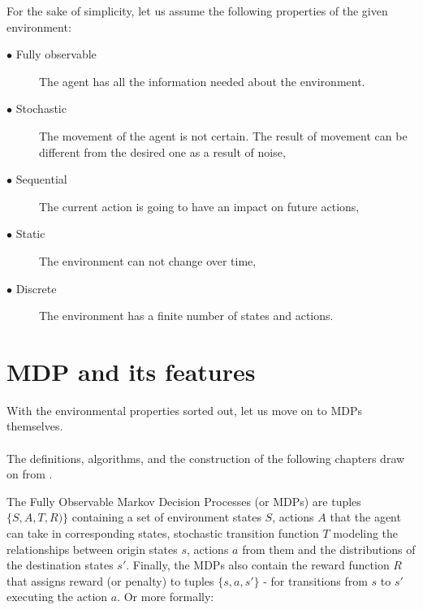 For the sake of simplicity, let us assume the following properties of the given environment:
\begin{description}


  \item[$\bullet$ Fully observable] The agent has all the information needed about the environment.
  \item[$\bullet$ Stochastic] The movement of the agent is not certain. The result of movement can be different from the desired one as a result of noise,
  \item[$\bullet$ Sequential] The current action is going to have an impact on future actions,
  \item[$\bullet$ Static] The environment can not change over time,
  \item[$\bullet$ Discrete] The environment has a finite number of states and actions.
\end{description}



\section{MDP and its features}
With the environmental properties sorted out, let us move on to MDPs themselves. 
\\ 
\\
The definitions, algorithms, and the construction of the following chapters draw on from \cite{Kolobov2012}. 

The Fully Observable Markov Decision Processes (or MDPs) are tuples $\{S, A, T, R)\}$ containing a set of environment states $S$, actions $A$ that the agent can take in corresponding states, stochastic transition function $T$ modeling the relationships between origin states $s$, actions $a$ from them and the distributions of the destination states $s'$. Finally, the MDPs also contain the reward function $R$ that assigns reward (or penalty) to tuples $\{s, a, s'\}$ - for transitions from $s$ to $s'$ executing the action $a$. Or more formally:

